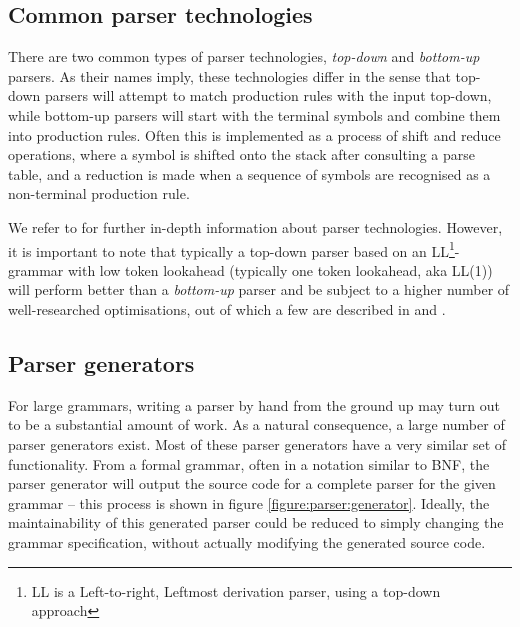 \subsection{Common parser technologies}
There are two common types of parser technologies, \textit{top-down} and
\textit{bottom-up} parsers. As their names imply, these technologies differ in
the sense that top-down parsers will attempt to match production rules with the
input top-down, while bottom-up parsers will start with the terminal symbols and combine them into production
rules. Often this is implemented as a process of shift and reduce operations,
where a symbol is shifted onto the stack after consulting a parse table, and a
reduction is made when a sequence of symbols are recognised as a non-terminal
production rule.

We refer to \cite{compiler_tech} for further in-depth information about parser
technologies. However, it is important to note that typically a top-down parser
based on an LL\footnote{LL is a Left-to-right, Leftmost derivation
parser, using a top-down approach}-grammar with low token lookahead (typically
one token lookahead, aka LL(1)) will perform better than a \textit{bottom-up}
parser and be subject to a higher number of well-researched optimisations, out
of which a few are described in \cite{compiler_tech} and
\cite{DBLP:books/cu/Appel1998c}.

\subsection{Parser generators}
For large grammars, writing a parser by hand from the ground up may turn out to
be a substantial amount of work. As a natural consequence, a large number of
parser generators exist. Most of these parser generators have a very
similar set of functionality. From a formal grammar, often in a notation
similar to BNF, the parser generator will output the source code for a
complete parser for the given grammar -- this process is shown in figure
\ref{figure:parser:generator}. Ideally, the maintainability of this generated parser could be reduced to simply changing the grammar specification,
without actually modifying the generated source code.

